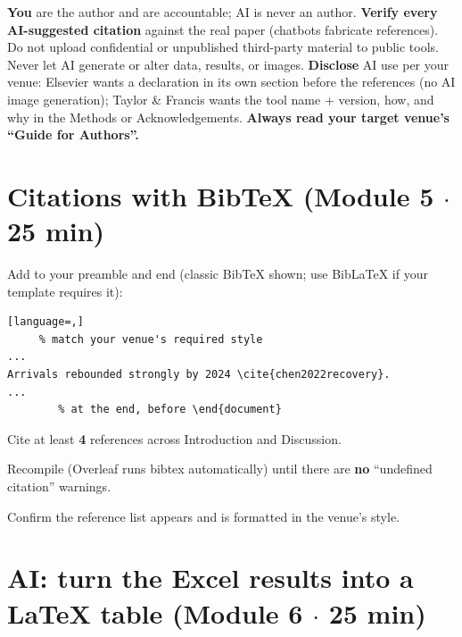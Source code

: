 \documentclass[11pt]{article}
\begin{document}
\begin{tcolorbox}[colback=softbg,colframe=chulapinkdk,boxrule=0.7pt,arc=2pt,title=\textbf{AI ethics --- before you go further},fonttitle=\color{white},colbacktitle=chulapinkdk]
\small
\textbf{You} are the author and are accountable; AI is never an author. \textbf{Verify every AI-suggested
citation} against the real paper (chatbots fabricate references). Do not upload confidential or
unpublished third-party material to public tools. Never let AI generate or alter data, results, or images.
\textbf{Disclose} AI use per your venue:
Elsevier wants a declaration in its own section before the references (no AI image generation);
Taylor \& Francis wants the tool name + version, how, and why in the Methods or Acknowledgements.
\textbf{Always read your target venue's ``Guide for Authors''.}
\end{tcolorbox}

\section{Citations with BibTeX \hfill {\normalfont\small (Module 5 $\cdot$ 25 min)}}

Add to your preamble and end (classic BibTeX shown; use BibLaTeX if your template requires it):
\begin{lstlisting}[language=,]
     % match your venue's required style
...
Arrivals rebounded strongly by 2024 \cite{chen2022recovery}.
...
        % at the end, before \end{document}
\end{lstlisting}

\begin{checklist}
\item Cite at least \textbf{4} references across Introduction and Discussion.
\item Recompile (Overleaf runs bibtex automatically) until there are \textbf{no} ``undefined citation'' warnings.
\item Confirm the reference list appears and is formatted in the venue's style.
\end{checklist}

\section{AI: turn the Excel results into a LaTeX table \hfill {\normalfont\small (Module 6 $\cdot$ 25 min)}}
\end{document}
